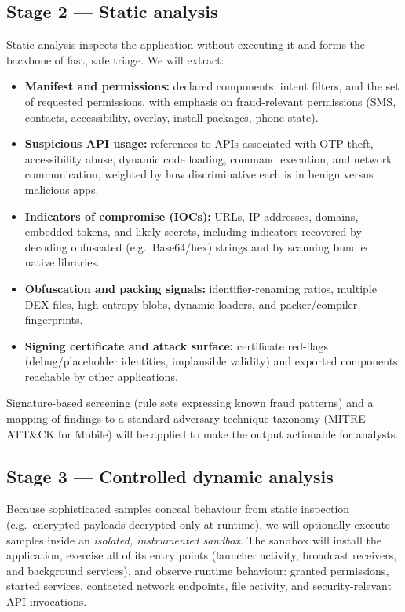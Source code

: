 \documentclass[11pt,a4paper]{article}
\begin{document}
\subsection{Stage 2 --- Static analysis}
Static analysis inspects the application without executing it and forms the backbone of
fast, safe triage. We will extract:
\begin{itemize}
  \item \textbf{Manifest and permissions:} declared components, intent filters, and the
  set of requested permissions, with emphasis on fraud-relevant permissions
  (SMS, contacts, accessibility, overlay, install-packages, phone state).
  \item \textbf{Suspicious API usage:} references to APIs associated with OTP theft,
  accessibility abuse, dynamic code loading, command execution, and network
  communication, weighted by how discriminative each is in benign versus malicious apps.
  \item \textbf{Indicators of compromise (IOCs):} URLs, IP addresses, domains, embedded
  tokens, and likely secrets, including indicators recovered by decoding obfuscated
  (e.g.\ Base64/hex) strings and by scanning bundled native libraries.
  \item \textbf{Obfuscation and packing signals:} identifier-renaming ratios, multiple
  DEX files, high-entropy blobs, dynamic loaders, and packer/compiler fingerprints.
  \item \textbf{Signing certificate and attack surface:} certificate red-flags
  (debug/placeholder identities, implausible validity) and exported components reachable
  by other applications.
\end{itemize}
Signature-based screening (rule sets expressing known fraud patterns) and a mapping of
findings to a standard adversary-technique taxonomy (MITRE ATT\&CK for Mobile) will be
applied to make the output actionable for analysts.

\subsection{Stage 3 --- Controlled dynamic analysis}
Because sophisticated samples conceal behaviour from static inspection (e.g.\ encrypted
payloads decrypted only at runtime), we will optionally execute samples inside an
\emph{isolated, instrumented sandbox}. The sandbox will install the application, exercise
all of its entry points (launcher activity, broadcast receivers, and background
services), and observe runtime behaviour: granted permissions, started services,
contacted network endpoints, file activity, and security-relevant API invocations.
\end{document}

